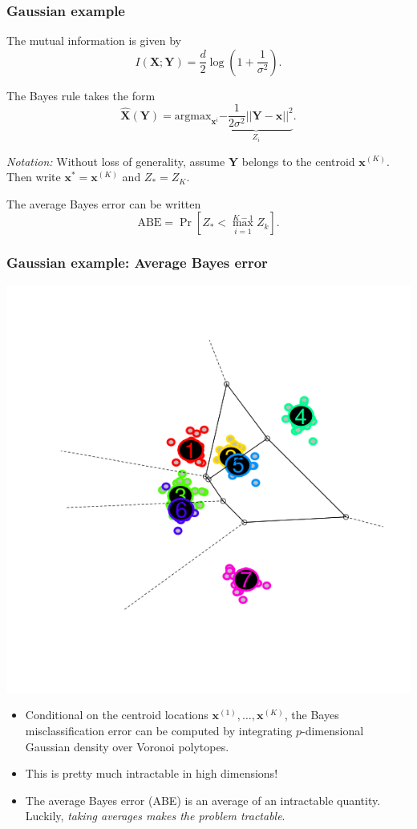 \documentclass{beamer}
\newcommand{\argmax}{\text{argmax}}
\newcommand{\bx}{\boldsymbol{x}}
\newcommand{\bX}{\boldsymbol{X}}
\newcommand{\bY}{\boldsymbol{Y}}
\begin{document}
\begin{frame}
\frametitle{Gaussian example}
The mutual information is given by
\[
I(\bX;\bY) = \frac{d}{2}\log(1 + \frac{1}{\sigma^2}).
\]

The Bayes rule takes the form
\[
\hat{\bX}(\bY) = \argmax_{\bx^{i}} \underbrace{-\frac{1}{2\sigma^2} ||\bY - \bx||^2}_{Z_i}.
\]

\emph{Notation:}
Without loss of generality, assume $\bY$ belongs to the centroid $\bx^{(K)}$.
Then write $\bx^* = \bx^{(K)}$ and $Z_* = Z_K$.

The average Bayes error can be written
\[
\text{ABE} = \Pr[Z_* < \max_{i=1}^{K-1} Z_k].
\]
\end{frame}

\begin{frame}
\frametitle{Gaussian example: Average Bayes error}

\begin{center}
\includegraphics[scale = 0.3, clip = true, trim = 0.6in 3in 0.6in 1.5in]{../info_theory_paper/gaussian_figure1a.png}
\end{center}

\begin{itemize}
\item Conditional on the centroid locations $\bx^{(1)},\hdots,
  \bx^{(K)}$, the Bayes misclassification error can be computed by
  integrating $p$-dimensional Gaussian density over Voronoi polytopes.
\item This is pretty much intractable in high dimensions!
\item The average Bayes error (ABE) is an average of
  an intractable quantity.  Luckily, \emph{taking averages makes
    the problem tractable}.
\end{itemize}
\end{frame}
\end{document}
